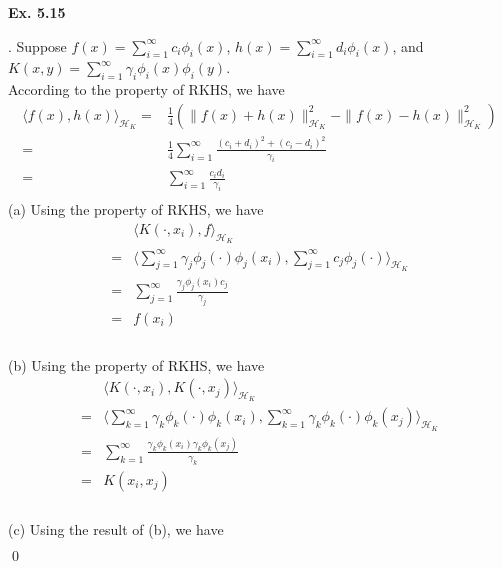 \documentclass[12pt]{article}
\newenvironment{sol}
  {\par\vspace{3mm}\noindent{\it Solution}.}
  {\qed}
\begin{document}
\begin{flushleft}
\textbf{Ex. 5.15}
\end{flushleft}
\def \hk {\mathcal{H}_K}
\begin{sol}
Suppose $f(x)=\sum\limits_{i=1}^{\infty}c_i\phi_i(x)$, $h(x)=\sum\limits_{i=1}^{\infty}d_i\phi_i(x)$, and $K(x,y)=\sum\limits_{i=1}^{\infty}\gamma_i\phi_i(x)\phi_i(y)$.\\
According to the property of RKHS, we have
\begin{equation*}
\begin{split}
\langle f(x),h(x)\rangle_{\hk}=&\frac{1}{4}(\|f(x)+h(x)\|^2_{\hk}-\|f(x)-h(x)\|^2_{\hk})\\
=&\frac{1}{4}\sum\limits_{i=1}^{\infty}\frac{(c_i+d_i)^2+(c_i-d_i)^2}{\gamma_i}\\
=&\sum\limits_{i=1}^{\infty}\frac{c_id_i}{\gamma_i}\\
\end{split}
\end{equation*}
(a) Using the property of RKHS, we have
\begin{equation*}
\begin{split}
&\langle K(\cdot,x_i),f\rangle_{\hk}\\
=&\langle\sum\limits_{j=1}^{\infty}\gamma_j\phi_j(\cdot)\phi_j(x_i),\sum\limits_{j=1}^{\infty}c_j\phi_j(\cdot)\rangle_{\hk}\\
=&\sum\limits_{j=1}^{\infty}\frac{\gamma_j\phi_j(x_i)c_j}{\gamma_j}\\
=&f(x_i)\\
\end{split}
\end{equation*}
\\
(b) Using the property of RKHS, we have
\begin{equation*}
\begin{split}
&\langle K(\cdot,x_i),K(\cdot,x_j)\rangle_{\hk}\\
=&\langle\sum\limits_{k=1}^{\infty}\gamma_k\phi_k(\cdot)\phi_k(x_i),\sum\limits_{k=1}^{\infty}\gamma_k\phi_k(\cdot)\phi_k(x_j)\rangle_{\hk}\\
=&\sum\limits_{k=1}^{\infty}\frac{\gamma_k\phi_k(x_i)\gamma_k\phi_k(x_j)}{\gamma_k}\\
=&K(x_i,x_j)\\
\end{split}
\end{equation*}
\\
(c) Using the result of (b), we have
\begin{equation*}
\begin{split}

\end{split}
\end{equation*}
\end{sol}
\end{document}
